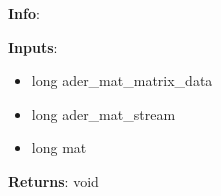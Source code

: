 \textbf{Info}:

\noindent \textbf{Inputs}:
\begin{itemize}
\item{long ader\_mat\_matrix\_data}
\item{long ader\_mat\_stream}
\item{long mat}
\end{itemize}

\noindent \textbf{Returns}: void
